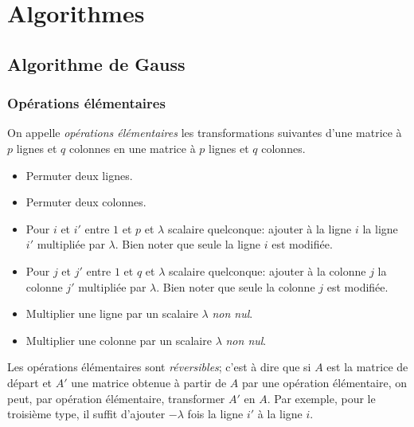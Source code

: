 

\section{Algorithmes}
\subsection{Algorithme de Gauss} 
\subsubsection{Opérations élémentaires}
 On appelle \emph{opérations élémentaires} les transformations suivantes d'une matrice à $p$ lignes et $q$ colonnes en une matrice à $p$ lignes et $q$ colonnes.
\begin{itemize}
 \item Permuter deux lignes.
 \item Permuter deux colonnes.
 \item Pour $i$ et $i'$ entre $1$ et $p$ et $\lambda$ scalaire quelconque: ajouter à la ligne $i$ la ligne $i'$ multipliée par $\lambda$. Bien noter que seule la ligne $i$ est modifiée.
 \item Pour $j$ et $j'$ entre $1$ et $q$ et $\lambda$ scalaire quelconque: ajouter à la colonne $j$ la colonne $j'$ multipliée par $\lambda$. Bien noter que seule la colonne $j$ est modifiée.
 \item Multiplier une ligne par un scalaire $\lambda$ \emph{non nul}.
 \item Multiplier une colonne par un scalaire $\lambda$ \emph{non nul}.
\end{itemize}
Les opérations élémentaires sont \emph{réversibles}; c'est à dire que si $A$ est la matrice de départ et $A'$ une matrice obtenue à partir de $A$ par une opération élémentaire, on peut, par opération élémentaire, transformer $A'$ en $A$. Par exemple, pour le troisième type, il suffit d'ajouter $-\lambda$ fois la ligne $i'$ à la ligne $i$.
